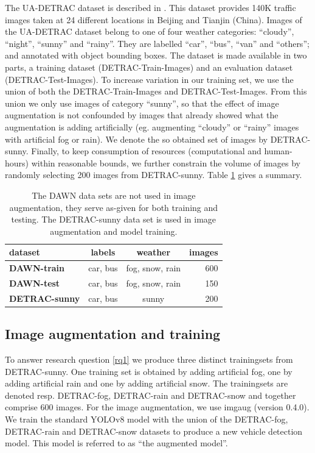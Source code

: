\documentclass[]{article}
\begin{document}
	The UA-DETRAC dataset is described in \cite{CVIU_UA-DETRAC}. This dataset provides 140K traffic images taken at 24 different locations in Beijing and Tianjin (China). Images of the UA-DETRAC dataset belong to one of four weather categories: ``cloudy'', ``night'', ``sunny'' and ``rainy''. They are labelled ``car'', ``bus'', ``van'' and ``others''; and annotated with object bounding boxes. The dataset is made available in two parts, a training dataset (DETRAC-Train-Images) and an evaluation dataset (DETRAC-Test-Images). To increase variation in our training set, we use the union of both the DETRAC-Train-Images and DETRAC-Test-Images. From this union we only use images of category ``sunny'', so that the effect of image augmentation is not confounded by images that already showed what the augmentation is adding artificially (eg. augmenting ``cloudy'' or ``rainy'' images with artificial fog or rain). We denote the so obtained set of images by DETRAC-sunny. Finally, to keep consumption of resources (computational and human-hours) within reasonable bounds, we further constrain the volume of images by randomly selecting 200 images from DETRAC-sunny. Table \ref{table:datasets} gives a summary.

	\begin{table}[H]
		\centering
		\begin{tabular}{lccr}
			\toprule
			\textbf{dataset} & \textbf{labels} & \textbf{weather} & \textbf{images} \\
			\midrule
			\textbf{DAWN-train} & car, bus & fog, snow, rain &  600 \\
			\textbf{DAWN-test} & car, bus & fog, snow, rain &  150 \\
			\textbf{DETRAC-sunny} & car, bus & sunny & 200 \\
			\bottomrule
		\end{tabular}
		\caption{The DAWN data sets are not used in image augmentation, they serve as-given for both training and testing. The DETRAC-sunny data set is used in image augmentation and model training.}
		\label{table:datasets}
	\end{table}

\subsection{Image augmentation and training}
	
	To answer research question \ref{rq1} we produce three distinct trainingsets from DETRAC-sunny. One training set is obtained by adding artificial fog, one by adding artificial rain and one by adding artificial snow. The trainingsets are denoted resp. DETRAC-fog, DETRAC-rain and DETRAC-snow and together comprise 600 images. For the image augmentation, we use imgaug \cite{imgaug} (version 0.4.0). We train the standard YOLO{\small v8} model with the union of the DETRAC-fog, DETRAC-rain and DETRAC-snow datasets to produce a new vehicle detection model. This model is referred to as ``the augmented model''. 
	
\end{document}
